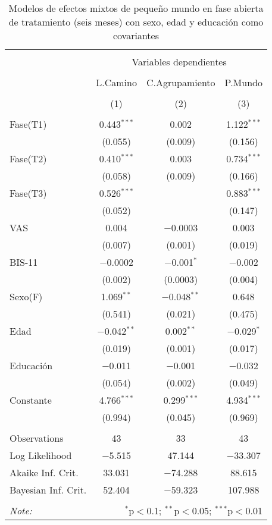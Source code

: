 \begin{table}[!htbp] \centering
  \caption{Modelos de efectos mixtos de pequeño mundo en fase abierta de tratamiento (seis meses) con sexo, edad y educación como covariantes}
  \label{}
\begin{tabular}{@{\extracolsep{5pt}}lccc}
\\[-1.8ex]\hline
\hline \\[-1.8ex]
 & \multicolumn{3}{c}{Variables dependientes} \\
\cline{2-4}
\\[-1.8ex] & L.Camino & C.Agrupamiento & P.Mundo \\
\\[-1.8ex] & (1) & (2) & (3)\\
\hline \\[-1.8ex]
 Fase(T1) & 0.443$^{***}$ & 0.002 & 1.122$^{***}$ \\
  & (0.055) & (0.009) & (0.156) \\
  Fase(T2) & 0.410$^{***}$ & 0.003 & 0.734$^{***}$ \\
  & (0.058) & (0.009) & (0.166) \\
  Fase(T3) & 0.526$^{***}$ &  & 0.883$^{***}$ \\
  & (0.052) &  & (0.147) \\
  VAS & 0.004 & $-$0.0003 & 0.003 \\
  & (0.007) & (0.001) & (0.019) \\
  BIS-11 & $-$0.0002 & $-$0.001$^{*}$ & $-$0.002 \\
  & (0.002) & (0.0003) & (0.004) \\
  Sexo(F) & 1.069$^{**}$ & $-$0.048$^{**}$ & 0.648 \\
  & (0.541) & (0.021) & (0.475) \\
  Edad & $-$0.042$^{**}$ & 0.002$^{**}$ & $-$0.029$^{*}$ \\
  & (0.019) & (0.001) & (0.017) \\
  Educación & $-$0.011 & $-$0.001 & $-$0.032 \\
  & (0.054) & (0.002) & (0.049) \\
  Constante & 4.766$^{***}$ & 0.299$^{***}$ & 4.934$^{***}$ \\
  & (0.994) & (0.045) & (0.969) \\
 \hline \\[-1.8ex]
Observations & 43 & 33 & 43 \\
Log Likelihood & $-$5.515 & 47.144 & $-$33.307 \\
Akaike Inf. Crit. & 33.031 & $-$74.288 & 88.615 \\
Bayesian Inf. Crit. & 52.404 & $-$59.323 & 107.988 \\
\hline
\hline \\[-1.8ex]
\textit{Note:}  & \multicolumn{3}{r}{$^{*}$p$<$0.1; $^{**}$p$<$0.05; $^{***}$p$<$0.01} \\
\end{tabular}
\end{table}
